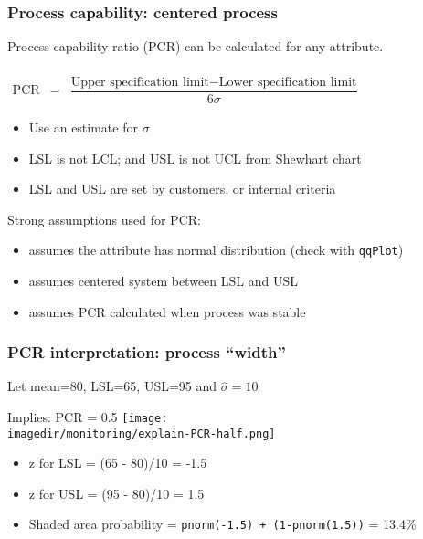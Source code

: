 \begin{frame}\frametitle{Process capability: centered process}

	Process capability ratio (PCR) can be calculated for any attribute.

	$
	\begin{array}{rcl}
		\\
		\text{PCR} &=& \dfrac{\text{Upper specification limit} - \text{Lower specification limit}}{6\sigma}
	\end{array}
	$
	\begin{itemize}
		\item	Use an estimate for $\sigma$
		\item	LSL is not LCL; and USL is not UCL from Shewhart chart
		\item	LSL and USL are set by customers, or internal criteria
	\end{itemize}

	Strong assumptions used for PCR:
	\begin{itemize}
		\item	assumes the attribute has normal distribution (check with \texttt{qqPlot})
		\item	assumes centered system between LSL and USL
		\item	assumes PCR calculated when process was stable
	\end{itemize}
\end{frame}

\begin{frame}\frametitle{PCR interpretation: process ``width''}

	Let mean=80, LSL=65, USL=95 and $\hat{\sigma} = 10$

	Implies: PCR = 0.5
	\texttt{[image: \\imagedir/monitoring/explain-PCR-half.png]}
	\begin{itemize}
		\item	z for LSL = (65 - 80)/10 = -1.5
		\item	z for USL = (95 - 80)/10 = 1.5
		\item	Shaded area probability = \texttt{pnorm(-1.5) + (1-pnorm(1.5))} = 13.4\%
	\end{itemize}
\end{frame}

